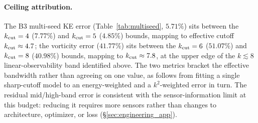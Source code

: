 \paragraph{Ceiling attribution.}
The B3 multi-seed KE error (Table~\ref{tab:multiseed}, $5.71\%$) sits between the $k_{\rm cut}=4$ ($7.77\%$) and $k_{\rm cut}=5$ ($4.85\%$) bounds, mapping to effective cutoff $k_{\rm cut}\approx 4.7$; the vorticity error ($41.77\%$) sits between the $k_{\rm cut}=6$ ($51.07\%$) and $k_{\rm cut}=8$ ($40.98\%$) bounds, mapping to $k_{\rm cut}\approx 7.8$, at the upper edge of the $k\lesssim 8$ linear-observability band identified above. The two metrics bracket the effective bandwidth rather than agreeing on one value, as follows from fitting a single sharp-cutoff model to an energy-weighted and a $k^2$-weighted error in turn. The residual mid/high-band error is consistent with the sensor-information limit at this budget: reducing it requires more sensors rather than changes to architecture, optimizer, or loss (\S\ref{sec:engineering_app}).
